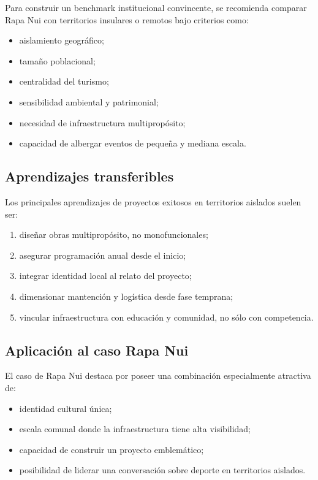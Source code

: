 \documentclass[12pt,letterpaper]{article}
\begin{document}
Para construir un benchmark institucional convincente, se recomienda comparar Rapa Nui con territorios insulares o remotos bajo criterios como:

\begin{itemize}
    \item aislamiento geográfico;
    \item tamaño poblacional;
    \item centralidad del turismo;
    \item sensibilidad ambiental y patrimonial;
    \item necesidad de infraestructura multipropósito;
    \item capacidad de albergar eventos de pequeña y mediana escala.
\end{itemize}

\subsection{Aprendizajes transferibles}

Los principales aprendizajes de proyectos exitosos en territorios aislados suelen ser:

\begin{enumerate}
    \item diseñar obras multipropósito, no monofuncionales;
    \item asegurar programación anual desde el inicio;
    \item integrar identidad local al relato del proyecto;
    \item dimensionar mantención y logística desde fase temprana;
    \item vincular infraestructura con educación y comunidad, no sólo con competencia.
\end{enumerate}

\subsection{Aplicación al caso Rapa Nui}

El caso de Rapa Nui destaca por poseer una combinación especialmente atractiva de:

\begin{itemize}
    \item identidad cultural única;
    \item escala comunal donde la infraestructura tiene alta visibilidad;
    \item capacidad de construir un proyecto emblemático;
    \item posibilidad de liderar una conversación sobre deporte en territorios aislados.
\end{itemize}
\end{document}
